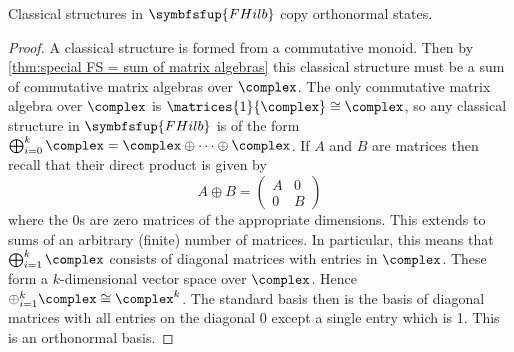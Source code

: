 \documentclass[fleqn]{NotesClass}
\makeatletter
\newcommand{\c@egory}[1]{\symbfsfup{#1}}
\newcommand{\FHilb}{\c@egory{FHilb}}
\newcommand{\isomorphic}{\cong}
\makeatother
\begin{document}
    \begin{crl}{}{}
        Classical structures in \(\FHilb\) copy orthonormal states.
        \begin{proof}
            A classical structure is formed from a commutative monoid.
            Then by \cref{thm:special FS = sum of matrix algebras} this classical structure must be a sum of commutative matrix algebras over \(\complex\).
            The only commutative matrix algebra over \(\complex\) is \(\matrices{1}{\complex} \isomorphic \complex\), so any classical structure in \(\FHilb\) is of the form \(\bigoplus_{i=0}^k \complex = \complex \oplus \dotsb \oplus \complex\).
            If \(A\) and \(B\) are matrices then recall that their direct product is given by
            \begin{equation}
                A \oplus B = 
                \begin{pmatrix}
                    A & 0\\
                    0 & B
                \end{pmatrix}
            \end{equation}
            where the \(0\)s are zero matrices of the appropriate dimensions.
            This extends to sums of an arbitrary (finite) number of matrices.
            In particular, this means that \(\bigoplus_{i=1}^{k} \complex\) consists of diagonal matrices with entries in \(\complex\).
            These form a \(k\)-dimensional vector space over \(\complex\).
            Hence \(\oplus_{i=1}^{k} \complex \isomorphic \complex^k\).
            The standard basis then is the basis of diagonal matrices with all entries on the diagonal 0 except a single entry which is 1.
            This is an orthonormal basis.
        \end{proof}
    \end{crl}
    
\end{document}
